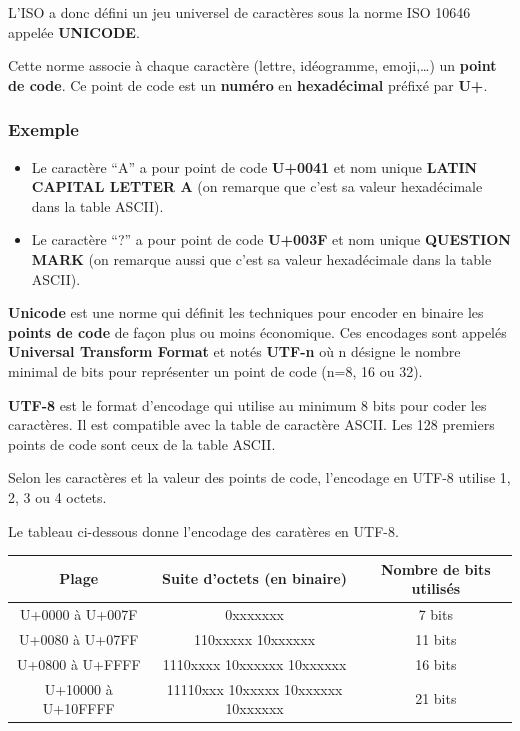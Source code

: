\documentclass[11pt]{article}
\providecommand{\tightlist}{%
      \setlength{\itemsep}{0pt}\setlength{\parskip}{0pt}}
\begin{document}
L'ISO a donc défini un jeu universel de caractères sous la norme ISO
10646 appelée \textbf{UNICODE}.

Cette norme associe à chaque caractère (lettre, idéogramme,
emoji,\ldots) un \textbf{point de code}. Ce point de code est un
\textbf{numéro} en \textbf{hexadécimal} préfixé par \textbf{U+}.

\hypertarget{exemple}{%
\subsubsection*{Exemple}\label{exemple}}

\begin{itemize}
\tightlist
\item
  Le caractère ``A'' a pour point de code \textbf{U+0041} et nom unique
  \textbf{LATIN CAPITAL LETTER A} (on remarque que c'est sa valeur
  hexadécimale dans la table ASCII).
\item
  Le caractère ``?'' a pour point de code \textbf{U+003F} et nom unique
  \textbf{QUESTION MARK} (on remarque aussi que c'est sa valeur
  hexadécimale dans la table ASCII).
\end{itemize}

\textbf{Unicode} est une norme qui définit les techniques pour encoder
en binaire les \textbf{points de code} de façon plus ou moins
économique. Ces encodages sont appelés \textbf{Universal Transform
Format} et notés \textbf{UTF-n} où n désigne le nombre minimal de bits
pour représenter un point de code (n=8, 16 ou 32).

\textbf{UTF-8} est le format d'encodage qui utilise au minimum 8 bits
pour coder les caractères. Il est compatible avec la table de caractère
ASCII. Les 128 premiers points de code sont ceux de la table ASCII.

Selon les caractères et la valeur des points de code, l'encodage en
UTF-8 utilise 1, 2, 3 ou 4 octets.

Le tableau ci-dessous donne l'encodage des caratères en UTF-8.

\begin{longtable}[]{@{}ccc@{}}
\toprule
\textbf{Plage} & \textbf{Suite d'octets (en binaire)} & \textbf{Nombre
de bits utilisés}\tabularnewline
\midrule
\endhead
U+0000 à U+007F & 0xxxxxxx & 7 bits\tabularnewline
U+0080 à U+07FF & 110xxxxx 10xxxxxx & 11 bits\tabularnewline
U+0800 à U+FFFF & 1110xxxx 10xxxxxx 10xxxxxx & 16 bits\tabularnewline
U+10000 à U+10FFFF & 11110xxx 10xxxxx 10xxxxxx 10xxxxxx & 21
bits\tabularnewline
\bottomrule
\end{longtable}
\end{document}
